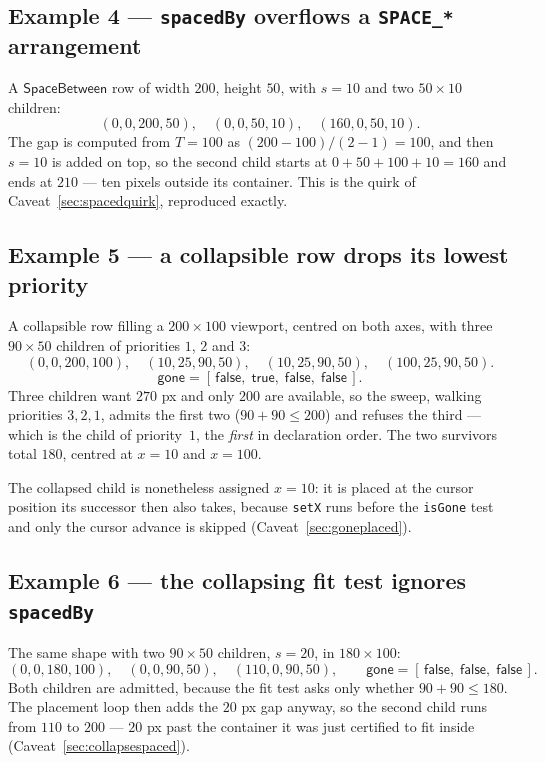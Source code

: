 \documentclass[11pt,a4paper]{article}
\newcommand{\gone}{\mathsf{gone}}
\newcommand{\SBetween}{\mathsf{SpaceBetween}}
\newcommand{\jv}[1]{\texttt{#1}}       %
\theoremstyle{definition}
\theoremstyle{plain}
\theoremstyle{remark}
\begin{document}
\subsection*{Example 4 --- \texttt{spacedBy} overflows a \texttt{SPACE\_*} arrangement}

A $\SBetween$ row of width $200$, height $50$, with $s = 10$ and two
$50 \times 10$ children:
\[
  (0,0,200,50),\quad (0,0,50,10),\quad (160,0,50,10).
\]
The gap is computed from $T = 100$ as $(200 - 100)/(2-1) = 100$, and then
$s = 10$ is added on top, so the second child starts at $0 + 50 + 100 + 10 =
160$ and ends at $210$ --- ten pixels outside its container. This is the quirk
of Caveat~\ref{sec:spacedquirk}, reproduced exactly.

\subsection*{Example 5 --- a collapsible row drops its lowest priority}

A collapsible row filling a $200 \times 100$ viewport, centred on both axes,
with three $90 \times 50$ children of priorities $1$, $2$ and $3$:
\[
  (0,0,200,100),\quad (10,25,90,50),\quad (10,25,90,50),\quad (100,25,90,50).
\]
\[
  \gone = [\,\textsf{false},\; \textsf{true},\; \textsf{false},\; \textsf{false}\,].
\]
Three children want $270$ px and only $200$ are available, so the sweep, walking
priorities $3, 2, 1$, admits the first two ($90 + 90 \leq 200$) and refuses the
third --- which is the child of priority~$1$, the \emph{first} in declaration
order. The two survivors total $180$, centred at $x = 10$ and $x = 100$.

The collapsed child is nonetheless assigned $x = 10$: it is placed at the cursor
position its successor then also takes, because \jv{setX} runs before the
\jv{isGone} test and only the cursor advance is skipped
(Caveat~\ref{sec:goneplaced}).

\subsection*{Example 6 --- the collapsing fit test ignores \texttt{spacedBy}}

The same shape with two $90 \times 50$ children, $s = 20$, in $180 \times 100$:
\[
  (0,0,180,100),\quad (0,0,90,50),\quad (110,0,90,50),
  \qquad \gone = [\,\textsf{false},\;\textsf{false},\;\textsf{false}\,].
\]
Both children are admitted, because the fit test asks only whether
$90 + 90 \leq 180$. The placement loop then adds the $20$ px gap anyway, so the
second child runs from $110$ to $200$ --- $20$ px past the container it was
just certified to fit inside (Caveat~\ref{sec:collapsespaced}).
\end{document}
